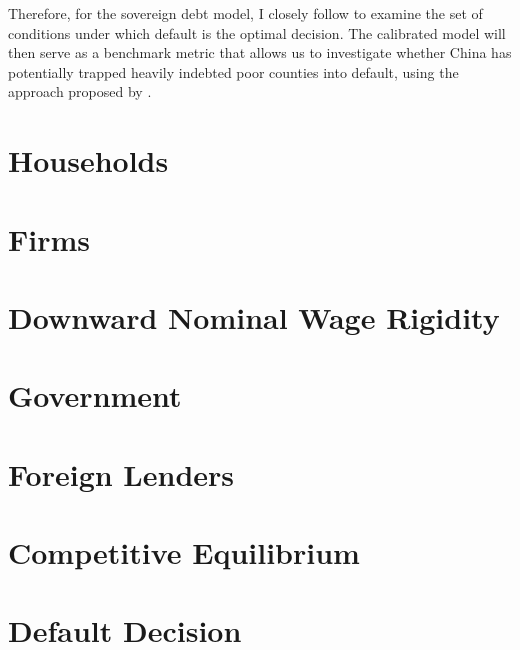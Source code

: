 Therefore, for the sovereign debt model, I closely follow \citet{Na-18} to examine the set of conditions under which default is the optimal decision.
The calibrated model will then serve as a benchmark metric that allows us to investigate whether China has potentially trapped heavily indebted poor counties into default, using the approach proposed by \citet*{Hinrichsen_2020-chapter4}.

\section{Households}


\section{Firms}


\section{Downward Nominal Wage Rigidity}


\section{Government}


\section{Foreign Lenders}


\section{Competitive Equilibrium}


\section{Default Decision}


